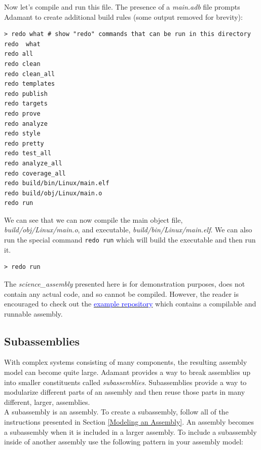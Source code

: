 Now let's compile and run this file. The presence of a \textit{main.adb} file prompts Adamant to create additional build rules (some output removed for brevity):

\vspace{5mm} %
\begin{verbatim}
> redo what # show "redo" commands that can be run in this directory
redo  what
redo all
redo clean
redo clean_all
redo templates
redo publish
redo targets
redo prove
redo analyze
redo style
redo pretty
redo test_all
redo analyze_all
redo coverage_all
redo build/bin/Linux/main.elf
redo build/obj/Linux/main.o
redo run
\end{verbatim}
\vspace{5mm} %

We can see that we can now compile the main object file, \textit{build/obj/Linux/main.o}, and executable, \textit{build/bin/Linux/main.elf}. We can also run the special command \texttt{redo run} which will build the executable and then run it.

\vspace{5mm} %
\begin{verbatim}
> redo run
\end{verbatim}
\vspace{5mm} %

The \textit{science\_assembly} presented here is for demonstration purposes, does not contain any actual code, and so cannot be compiled. However, the reader is encouraged to check out the \href{https://github.com/lasp/adamant_example/tree/main}{\textcolor{blue}{example repository}} which contains a compilable and runnable assembly. \\
 
\subsection{Subassemblies}

With complex systems consisting of many components, the resulting assembly model can become quite large. Adamant provides a way to break assemblies up into smaller constituents called \textit{subassemblies}. Subassemblies provide a way to modularize different parts of an assembly and then reuse those parts in many different, larger, assemblies. \\

A subassembly is an assembly. To create a subassembly, follow all of the instructions presented in Section \ref{Modeling an Assembly}. An assembly becomes a subassembly when it is included in a larger assembly. To include a subassembly inside of another assembly use the following pattern in your assembly model: \\

